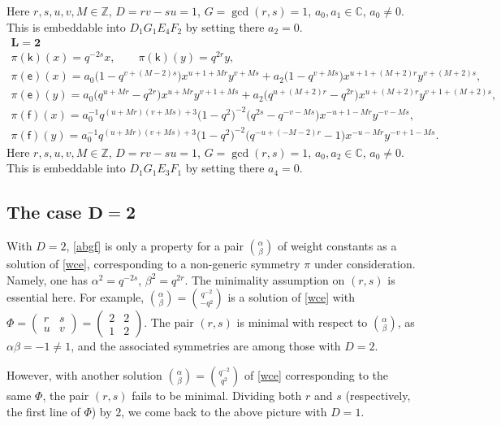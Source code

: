 \documentclass[pdftex]{sigma}
\numberwithin{equation}{section}
\begin{document}
Here $r,s,u,v,M\in\mathbb{Z}$, $D=rv-su=1$, $G=\operatorname{gcd}(r,s)=1$, $a_0,a_1\in\mathbb{C}$, $a_0\ne 0$. This is embeddable into $D_1G_1E_4F_2$ by setting there $a_2=0$.
\begin{gather*}
 \mathbf{L}=\mathbf{2}\\
\pi(\mathsf{k})(x)= q^{-2s}x ,\qquad\pi(\mathsf{k})(y)=q^{2r}y ,\\
\pi(\mathsf{e})(x)= a_0\big(1-q^{v+(M-2)s}\big)x^{u+1+Mr}y^{v+Ms}+ a_2\big(1-q^{v+Ms}\big)x^{u+1+(M+2)r}y^{v+(M+2)s} ,\\
\pi(\mathsf{e})(y)= a_0\big(q^{u+Mr}-q^{2r}\big)x^{u+Mr}y^{v+1+Ms}+ a_2\big(q^{u+(M+2)r}-q^{2r}\big)x^{u+(M+2)r}y^{v+1+(M+2)s} ,\\
\pi(\mathsf{f})(x)= a_0^{-1}q^{(u+Mr)(v+Ms)+3}\big(1-q^2\big)^{-2}\big(q^{2s}-q^{-v-Ms}\big)x^{-u+1-Mr}y^{-v-Ms} ,\\
\pi(\mathsf{f})(y)= a_0^{-1}q^{(u+Mr)(v+Ms)+3}\big(1-q^2\big)^{-2}\big(q^{-u+(-M-2)r}-1\big)x^{-u-Mr}y^{-v+1-Ms} .
\end{gather*}
Here $r,s,u,v,M\in\mathbb{Z}$, $D=rv-su=1$, $G=\operatorname{gcd}(r,s)=1$, $a_0,a_2\in\mathbb{C}$, $a_0\ne 0$. This is embeddable into $D_1G_1E_3F_1$ by setting there $a_4=0$.

\subsection[The case $D=2$]{The case $\boldsymbol{D=2}$}

With $D=2$, \eqref{abgf} is only a property for a pair $\binom{\alpha}{\beta}$ of weight constants as a solution of \eqref{wce}, corresponding to a non-generic symmetry $\pi$ under consideration. Namely, one has $\alpha^2=q^{-2s}$, $\beta^2=q^{2r}$. The minimality assumption on $(r,s)$ is essential here. For example, $\binom{\alpha}{\beta}=\binom{q^{-2}}{-q^2}$ is a solution of \eqref{wce} with $\Phi=\left(\begin{smallmatrix}r & s\\ u & v\end{smallmatrix}\right)=\left(\begin{smallmatrix}2 & 2\\ 1 & 2\end{smallmatrix}\right)$. The pair $(r,s)$ is minimal with respect to $\binom{\alpha}{\beta}$, as $\alpha\beta=-1\ne 1$, and the associated symmetries are among those with $D=2$.

However, with another solution $\binom{\alpha}{\beta}=\binom{q^{-2}}{q^2}$ of \eqref{wce} corresponding to the same $\Phi$, the pair $(r,s)$ fails to be minimal. Dividing both $r$ and $s$ (respectively, the first line of $\Phi$) by $2$, we come back to the above picture with $D=1$.
\end{document}
